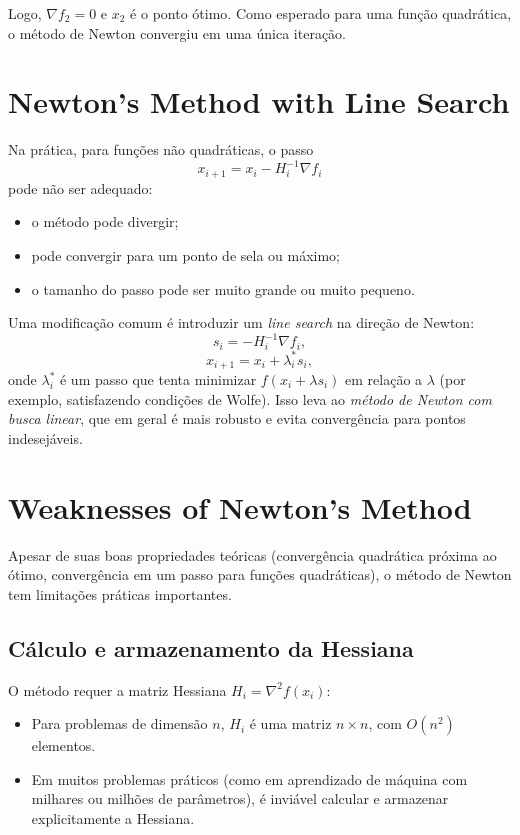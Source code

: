 \documentclass[9pt,a4paper]{extarticle}
\begin{document}
Logo, $\nabla f_2 = 0$ e $x_2$ é o ponto ótimo.
Como esperado para uma função quadrática, o método de Newton convergiu em
uma única iteração.

\section{Newton's Method with Line Search}

Na prática, para funções não quadráticas, o passo
\[
x_{i+1} = x_i - H_i^{-1} \nabla f_i
\]
pode não ser adequado:
\begin{itemize}
    \item o método pode divergir;
    \item pode convergir para um ponto de sela ou máximo;
    \item o tamanho do passo pode ser muito grande ou muito pequeno.
\end{itemize}

Uma modificação comum é introduzir um \emph{line search} na direção de Newton:
\[
s_i = - H_i^{-1} \nabla f_i,
\]
\[
x_{i+1} = x_i + \lambda_i^* s_i,
\]
onde $\lambda_i^*$ é um passo que tenta minimizar $f(x_i + \lambda s_i)$ em relação a $\lambda$ (por exemplo, satisfazendo condições de Wolfe). Isso leva ao \emph{método de Newton com busca linear}, que em geral é mais robusto e evita convergência para pontos indesejáveis.

\section{Weaknesses of Newton's Method}

Apesar de suas boas propriedades teóricas (convergência quadrática próxima ao
ótimo, convergência em um passo para funções quadráticas), o método de Newton
tem limitações práticas importantes.

\subsection*{Cálculo e armazenamento da Hessiana}

O método requer a matriz Hessiana $H_i = \nabla^2 f(x_i)$:
\begin{itemize}
    \item Para problemas de dimensão $n$, $H_i$ é uma matriz $n \times n$, com
          $O(n^2)$ elementos.
    \item Em muitos problemas práticos (como em aprendizado de máquina com
          milhares ou milhões de parâmetros), é inviável calcular e armazenar
          explicitamente a Hessiana.
\end{itemize}
\end{document}
